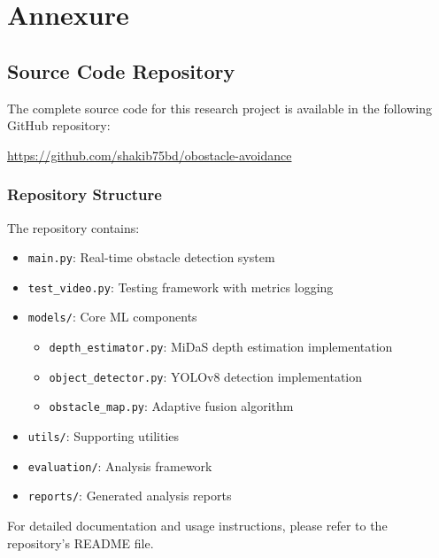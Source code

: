 \documentclass[12pt,oneside]{book}
\begin{document}
\chapter*{Annexure}

\section*{Source Code Repository}

The complete source code for this research project is available in the following GitHub repository:

\begin{center}
\url{https://github.com/shakib75bd/obostacle-avoidance}
\end{center}

\subsection*{Repository Structure}

The repository contains:
\begin{itemize}
\item \texttt{main.py}: Real-time obstacle detection system
\item \texttt{test\_video.py}: Testing framework with metrics logging
\item \texttt{models/}: Core ML components
    \begin{itemize}
    \item \texttt{depth\_estimator.py}: MiDaS depth estimation implementation
    \item \texttt{object\_detector.py}: YOLOv8 detection implementation
    \item \texttt{obstacle\_map.py}: Adaptive fusion algorithm
    \end{itemize}
\item \texttt{utils/}: Supporting utilities
\item \texttt{evaluation/}: Analysis framework
\item \texttt{reports/}: Generated analysis reports
\end{itemize}

For detailed documentation and usage instructions, please refer to the repository's README file.
\end{document}
